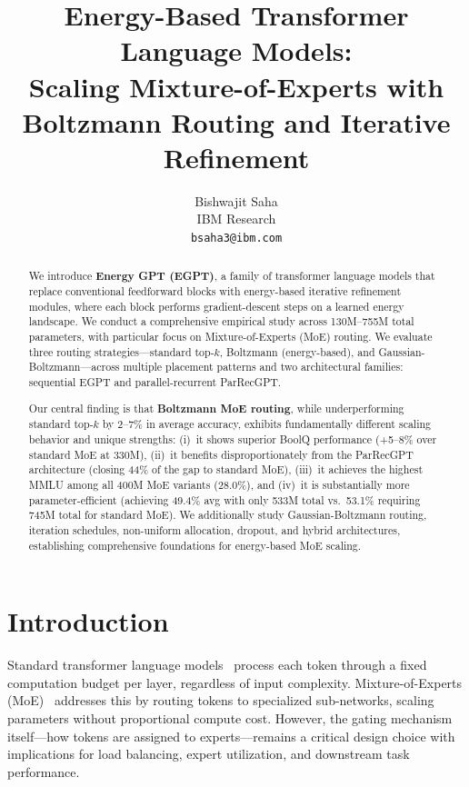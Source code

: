 \documentclass[oneside]{article}
\title{Energy-Based Transformer Language Models:\\Scaling Mixture-of-Experts with Boltzmann Routing and Iterative Refinement}
\author{
  Bishwajit Saha \\
  IBM Research \\
  \texttt{bsaha3@ibm.com}
}
\begin{document}
\maketitle

\begin{abstract}
We introduce \textbf{Energy GPT (EGPT)}, a family of transformer language models that replace conventional feedforward blocks with energy-based iterative refinement modules, where each block performs gradient-descent steps on a learned energy landscape. We conduct a comprehensive empirical study across 130M--755M total parameters, with particular focus on Mixture-of-Experts (MoE) routing. We evaluate three routing strategies---standard top-$k$, Boltzmann (energy-based), and Gaussian-Boltzmann---across multiple placement patterns and two architectural families: sequential EGPT and parallel-recurrent ParRecGPT.

Our central finding is that \textbf{Boltzmann MoE routing}, while underperforming standard top-$k$ by 2--7\% in average accuracy, exhibits fundamentally different scaling behavior and unique strengths: (i)~it shows superior BoolQ performance (+5--8\% over standard MoE at 330M), (ii)~it benefits disproportionately from the ParRecGPT architecture (closing 44\% of the gap to standard MoE), (iii)~it achieves the highest MMLU among all 400M MoE variants (28.0\%), and (iv)~it is substantially more parameter-efficient (achieving 49.4\% avg with only 533M total vs.\ 53.1\% requiring 745M total for standard MoE). We additionally study Gaussian-Boltzmann routing, iteration schedules, non-uniform allocation, dropout, and hybrid architectures, establishing comprehensive foundations for energy-based MoE scaling.
\end{abstract}


\section{Introduction}

Standard transformer language models~\citep{vaswani2017attention} process each token through a fixed computation budget per layer, regardless of input complexity. Mixture-of-Experts (MoE)~\citep{shazeer2017outrageously,fedus2022switch} addresses this by routing tokens to specialized sub-networks, scaling parameters without proportional compute cost. However, the gating mechanism itself---how tokens are assigned to experts---remains a critical design choice with implications for load balancing, expert utilization, and downstream task performance.
\end{document}
